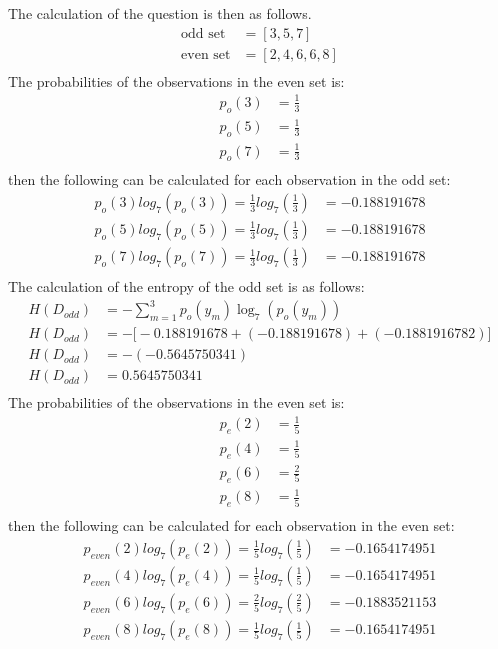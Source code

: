 \documentclass[10pt]{article}
\begin{document}
The calculation of the question is then as follows.
\begin{align*}
    \text{odd set} &= [3,5,7] \\
    \text{even set} &= [2,4,6,6,8] \\
\end{align*}
The probabilities of the observations in the even set is:
\begin{align*}
    p_{o}(3) &= \frac{1}{3} \\
    p_{o}(5) &= \frac{1}{3} \\
    p_{o}(7) &= \frac{1}{3} \\
\end{align*}
then the following can be calculated for each observation in the odd set:
\begin{align*}
    p_{o}(3) log_7 \left( p_{o}(3) \right) = \frac{1}{3} log_7 \left( \frac{1}{3} \right) &= -0.188191678\\
    p_{o}(5) log_7 \left( p_{o}(5) \right) = \frac{1}{3} log_7 \left( \frac{1}{3} \right) &= -0.188191678\\
    p_{o}(7) log_7 \left( p_{o}(7) \right) = \frac{1}{3} log_7 \left( \frac{1}{3} \right) &= -0.188191678\\
\end{align*}
The calculation of the entropy of the odd set is as follows:
\begin{align*}
    H(D_{odd}) &= - \sum_{m=1}^{3} p_{o}(y_m) \log_7 \left( p_{o}(y_m) \right) \\
    H(D_{odd}) &= - \big[ -0.188191678 + (-0.188191678) + (-0.1881916782)\big] \\
    H(D_{odd}) &= - (-0.5645750341) \\
    H(D_{odd}) &= 0.5645750341 \\
\end{align*}
The probabilities of the observations in the even set is:
\begin{align*}
    p_{e}(2) &= \frac{1}{5} \\
    p_{e}(4) &= \frac{1}{5} \\
    p_{e}(6) &= \frac{2}{5} \\
    p_{e}(8) &= \frac{1}{5} \\
\end{align*}
then the following can be calculated for each observation in the even set:
\begin{align*}
    p_{even}(2) log_7 \left( p_{e}(2) \right) = \frac{1}{5} log_7 \left( \frac{1}{5} \right) &= -0.1654174951\\
    p_{even}(4) log_7 \left( p_{e}(4) \right) = \frac{1}{5} log_7 \left( \frac{1}{5} \right) &= -0.1654174951\\
    p_{even}(6) log_7 \left( p_{e}(6) \right) = \frac{2}{5} log_7 \left( \frac{2}{5} \right) &= -0.1883521153\\
    p_{even}(8) log_7 \left( p_{e}(8) \right) = \frac{1}{5} log_7 \left( \frac{1}{5} \right) &= -0.1654174951\\
\end{align*}
\end{document}
